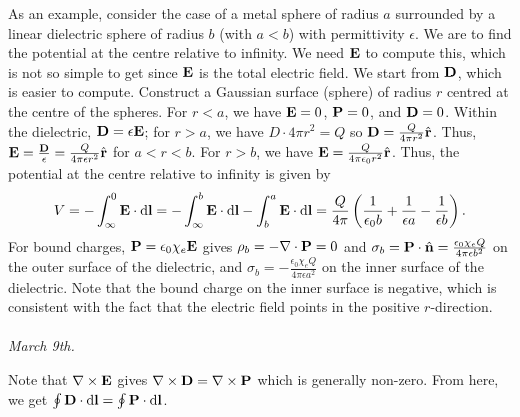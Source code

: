 As an example, consider the case of a metal sphere of radius $a$ surrounded by a linear dielectric sphere of radius $b$ (with $a < b$) with permittivity $\epsilon$. We are to find the potential at the centre relative to infinity. We need $\mathbf{E}$ to compute this, which is not so simple to get since $\mathbf{E}$ is the total electric field. We start from $\mathbf{D}$, which is easier to compute. Construct a Gaussian surface (sphere) of radius $r$ centred at the centre of the spheres. For $r < a$, we have $\mathbf{E} = 0$, $\mathbf{P} = 0$, and $\mathbf{D} = 0$. Within the dielectric, $\mathbf{D} = \epsilon \mathbf{E}$; for $r > a$, we have $D \cdot 4 \pi r^{2} = Q$ so $\mathbf{D} = \frac{Q}{4 \pi r^{2}} \hat{\mathbf{r}}$. Thus, $\mathbf{E} = \frac{\mathbf{D}}{\epsilon} = \frac{Q}{4 \pi \epsilon r^{2}} \hat{\mathbf{r}}$ for $a < r < b$. For $r > b$, we have $\mathbf{E} = \frac{Q}{4 \pi \epsilon_{0} r^{2}} \hat{\mathbf{r}}$. Thus, the potential at the centre relative to infinity is given by
\begin{align}
    V = -\int_{\infty}^{0} \mathbf{E} \cdot \mathrm{d}\mathbf{l} = -\int_{\infty}^{b} \mathbf{E} \cdot \mathrm{d}\mathbf{l} - \int_{b}^{a} \mathbf{E} \cdot \mathrm{d}\mathbf{l} = \frac{Q}{4 \pi} \left( \frac{1}{\epsilon_{0} b} + \frac{1}{\epsilon a} - \frac{1}{\epsilon b} \right).
\end{align}
For bound charges, $\mathbf{P} = \epsilon_{0} \chi_{e} \mathbf{E}$ gives $\rho_{b} = -\nabla \cdot \mathbf{P} = 0$ and $\sigma_{b} = \mathbf{P} \cdot \hat{\mathbf{n}} = \frac{\epsilon_{0} \chi_{e} Q}{4 \pi \epsilon b^{2}}$ on the outer surface of the dielectric, and $\sigma_{b} = -\frac{\epsilon_{0} \chi_{e} Q}{4 \pi \epsilon a^{2}}$ on the inner surface of the dielectric. Note that the bound charge on the inner surface is negative, which is consistent with the fact that the electric field points in the positive $r$-direction.
\\ \\
\noindent \textit{March 9th.}

Note that $\nabla \times \mathbf{E}$ gives $\nabla \times \mathbf{D} = \nabla \times \mathbf{P}$ which is generally non-zero. From here, we get $\oint \mathbf{D} \cdot \mathrm{d}\mathbf{l} = \oint \mathbf{P} \cdot \mathrm{d}\mathbf{l}$.

